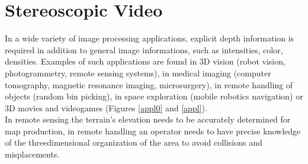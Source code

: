 \chapter{Stereoscopic Video}
\label{stereo_video}

In a wide variety of image processing applications, explicit depth information is required in
addition to general image informations, such as intensities, color, densities.
Examples of such applications are found in 3D vision (robot vision, photogrammetry, remote sensing systems), in medical imaging (computer tomography,
magnetic resonance imaging, microsurgery), in remote handling of objects (random bin picking), in space exploration (mobile robotics navigation) or 3D movies and videogames (Figures \ref{appl0} and \ref{appl}).\\
In remote sensing the terrain's elevation needs to be accurately determined for map production, in remote handling an operator needs to have precise knowledge of the threedimensional organization of the area to avoid collisions and misplacements.\\
